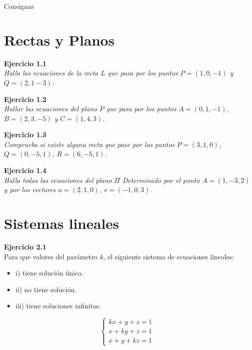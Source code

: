 \documentclass{article}
\newenvironment{problem}[2][Ejercicio]
    { \begin{mdframed}[backgroundcolor=gray!20] \textbf{#1 #2} \\}
    {  \end{mdframed}}
\begin{document}
\begin{mdframed}[backgroundcolor=blue!20]
Consignas
\end{mdframed}

\section{Rectas y Planos}\label{sec:rectas-y-planos}

\begin{problem}{1.1}
    \emph{Halla las ecuaciones de la recta $L$ que pasa por los puntos $P = (1,0,-1)$ y $Q = (2,1-3)$:}
    \end{problem}
    \begin{problem}{1.2}
    \emph{Hallar las ecuaciones del plano $P$ que pasa por los puntos $A=(0,1,-1),$ $B=(2,3,-5)$ y $C=(1,4,3)$.}    
\end{problem}
\begin{problem}{1.3}
    \emph{Comprueba si existe alguna recta que pase por los puntos $P=(3,1,0)$, $Q=(0,-5,1)$, $R=(6,-5,1)$}.
    \end{problem}
    \begin{problem}{1.4}
    \emph{Halla todas las ecuaciones del plano $\Pi$ Determinado por el punto $A=(1,-3,2)$ y por los vectores $u=(2,1,0)$, $v=(-1,0,3)$}.
    \end{problem}


\section{Sistemas lineales}\label{sec:sist-lineales}
\begin{problem}{2.1}

Para que valores del parámetro $k$, el siguiente sistema de ecuaciones lineales:
\begin{itemize}
\item 
i) tiene solución única.
\item 
ii) no tiene solución.
\item 
iii) tiene soluciones infinitas.
\end{itemize}
\[
\begin{cases}
kx + y + z = 1 \\
x + ky + z = 1 \\
x + y + kz = 1
\end{cases}
\]
\end{problem}
\end{document}
